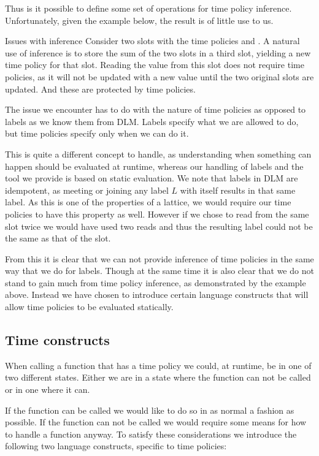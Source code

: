 Thus is it possible to define some set of operations for time policy inference.
Unfortunately, given the example below, the result is of little use to us.

\begin{example}{Issues with inference}
  Consider two slots with the time policies  and .
  A natural use of inference is to store the sum of the two slots in a third slot, yielding a new time policy for that slot.
  Reading the value from this slot does not require time policies, as it will not be updated with a new value until the two original slots are updated.
  And these are protected by time policies.
\end{example}

The issue we encounter has to do with the nature of time policies as opposed to labels as we know them from DLM.
Labels specify what we are allowed to do, but time policies specify only when we can do it.

This is quite a different concept to handle, as understanding when something can happen should be evaluated at runtime, whereas our handling of labels and the tool we provide is based on static evaluation.
We note that labels in DLM are idempotent, as meeting or joining any label $L$ with itself results in that same label.
As this is one of the properties of a lattice, we would require our time policies to have this property as well.
However if we chose to read from the same slot twice we would have used two reads and thus the resulting label could not be the same as that of the slot.

From this it is clear that we can not provide inference of time policies in the same way that we do for labels.
Though at the same time it is also clear that we do not stand to gain much from time policy inference, as demonstrated by the example above.
Instead we have chosen to introduce certain language constructs that will allow time policies to be evaluated statically.

\subsection{Time constructs}
When calling a function that has a time policy we could, at runtime, be in one of two different states.
Either we are in a state where the function can not be called or in one where it can.

If the function can be called we would like to do so in as normal a fashion as possible.
If the function can not be called we would require some means for how to handle a function anyway.
To satisfy these considerations we introduce the following two language constructs, specific to time policies:

